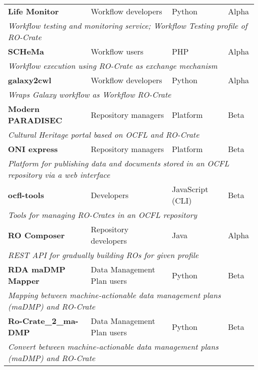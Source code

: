 \begin{table}[htbp]
\begin{tabular}{llll}
		\textbf{Life Monitor} \citep{about-lifemonitor} & Workflow developers & Python & Alpha \\
		\multicolumn{4}{l}{\it Workflow testing and monitoring service; Workflow Testing profile of RO-Crate} \\
		
        \textbf{SCHeMa} \citep{arxiv:2103.13138v1} & Workflow users & PHP & Alpha \\
        \multicolumn{4}{l}{\it Workflow execution using RO-Crate as exchange mechanism} \\

		\textbf{galaxy2cwl} \citep{galaxy2cwl} & Workflow developers & Python & Alpha \\
		\multicolumn{4}{l}{\it Wraps Galaxy workflow as Workflow RO-Crate} \\

		\textbf{Modern PARADISEC} \citep{modpdsc} & Repository managers & Platform & Beta \\
		\multicolumn{4}{l}{\it Cultural Heritage portal based on OCFL and RO-Crate} \\
		
		\textbf{ONI express} \citep{arkisto-data-portal} & Repository managers & Platform & Beta \\
		\multicolumn{4}{l}{\it Platform for publishing data and documents stored in an OCFL repository via a web interface} \\
		
		\textbf{ocfl-tools} \citep{ocfl-tools} & Developers & JavaScript (CLI) & Beta \\
		\multicolumn{4}{l}{\it Tools for managing RO-Crates in an OCFL repository}\\
		
		\textbf{RO Composer} \citep{ro-composer} & Repository developers & Java & Alpha \\ 
		\multicolumn{4}{l}{\it REST API for gradually building ROs for given profile} \\
		
		\textbf{RDA maDMP Mapper} \citep{doi:10.5281/zenodo.3922136} & Data Management Plan users & Python & Beta \\
		\multicolumn{4}{l}{\it Mapping between machine-actionable data management plans (maDMP) and RO-Crate\citep{doi:10.4126/frl01-006423291} } \\

        \textbf{Ro-Crate\_2\_ma-DMP} \citep{doi:10.5281/zenodo.3903463} & Data Management Plan users & Python & Beta \\
        \multicolumn{4}{l}{\it Convert between machine-actionable data management plans (maDMP) and RO-Crate } \\
        

\end{tabular}
\end{table}

